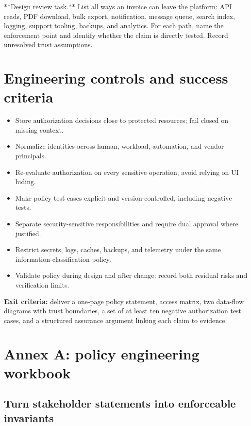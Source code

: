 \documentclass[
  letterpaper,
]{article}
\providecommand{\tightlist}{%
  \setlength{\itemsep}{0pt}\setlength{\parskip}{0pt}}
\begin{document}
\begin{fieldwork}
**Design review task.** List all ways an invoice can leave the platform: API reads, PDF download, bulk export, notification, message queue, search index, logging, support tooling, backups, and analytics. For each path, name the enforcement point and identify whether the claim is directly tested. Record unresolved trust assumptions.
\end{fieldwork}

\section{Engineering controls and success
criteria}\label{engineering-controls-and-success-criteria}

\begin{itemize}
\tightlist
\item
  Store authorization decisions close to protected resources; fail
  closed on missing context.
\item
  Normalize identities across human, workload, automation, and vendor
  principals.
\item
  Re-evaluate authorization on every sensitive operation; avoid relying
  on UI hiding.
\item
  Make policy test cases explicit and version-controlled, including
  negative tests.
\item
  Separate security-sensitive responsibilities and require dual approval
  where justified.
\item
  Restrict secrets, logs, caches, backups, and telemetry under the same
  information-classification policy.
\item
  Validate policy during design and after change; record both residual
  risks and verification limits.
\end{itemize}

\textbf{Exit criteria:} deliver a one-page policy statement, access
matrix, two data-flow diagrams with trust boundaries, a set of at least
ten negative authorization test cases, and a structured assurance
argument linking each claim to evidence.

\section{Annex A: policy engineering
workbook}\label{annex-a-policy-engineering-workbook}

\subsection{Turn stakeholder statements into enforceable
invariants}\label{turn-stakeholder-statements-into-enforceable-invariants}
\end{document}
